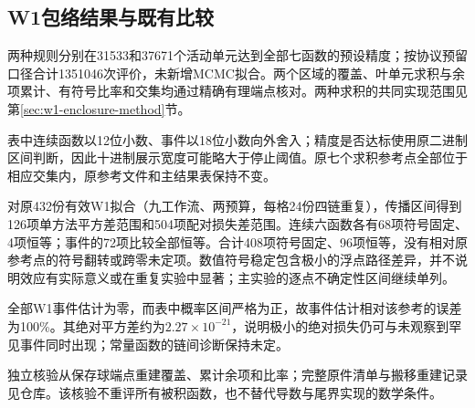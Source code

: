 \subsection{W1包络结果与既有比较}
\label{sec:w1-enclosure-results}
两种规则分别在31533和37671个活动单元达到全部七函数的预设精度；按协议预留口径合计1351046次评价，未新增MCMC拟合。两个区域的覆盖、叶单元求积与余项累计、有符号比率和交集均通过精确有理端点核对。两种求积的共同实现范围见第\ref{sec:w1-enclosure-method}节。





表中连续函数以12位小数、事件以18位小数向外舍入；精度是否达标使用原二进制区间判断，因此十进制展示宽度可能略大于停止阈值。原七个求积参考点全部位于相应交集内，原参考文件和主结果表保持不变。

对原432份有效W1拟合（九工作流、两预算，每格24份四链重复），传播区间得到126项单方法平方差范围和504项配对损失差范围。连续六函数各有68项符号固定、4项恒等；事件的72项比较全部恒等。合计408项符号固定、96项恒等，没有相对原参考点的符号翻转或跨零未定项。数值符号稳定包含极小的浮点路径差异，并不说明效应有实际意义或在重复实验中显著；主实验的逐点不确定性区间继续单列。

全部W1事件估计为零，而表中概率区间严格为正，故事件估计相对该参考的误差为100\%。其绝对平方差约为$2.27\times10^{-21}$，说明极小的绝对损失仍可与未观察到罕见事件同时出现；常量函数的链间诊断保持未定。

独立核验从保存球端点重建覆盖、累计余项和比率；完整原件清单与搬移重建记录见仓库。该核验不重评所有被积函数，也不替代导数与尾界实现的数学条件。
